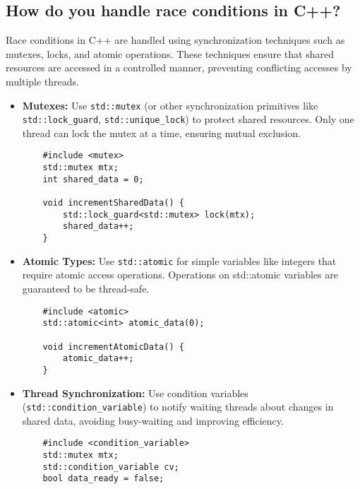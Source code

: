 \subsection{How do you handle race conditions in C++?}
Race conditions in C++ are handled using synchronization techniques such as mutexes, locks, and atomic operations. These techniques ensure that shared resources are accessed in a controlled manner, preventing conflicting accesses by multiple threads. \\
\begin{itemize}
    \item \textbf{Mutexes:} Use \texttt{std::mutex} (or other synchronization primitives like \texttt{std::lock\_guard}, \texttt{std::unique\_lock}) to protect shared resources. Only one thread can lock the mutex at a time, ensuring mutual exclusion.
    \begin{tcolorbox}[title=Mutexes]
    \begin{verbatim}
    #include <mutex>
    std::mutex mtx;
    int shared_data = 0;

    void incrementSharedData() {
        std::lock_guard<std::mutex> lock(mtx);
        shared_data++;
    }
    \end{verbatim}
    \end{tcolorbox}
    \item \textbf{Atomic Types:} Use \texttt{std::atomic} for simple variables like integers that require atomic access operations. Operations on std::atomic variables are guaranteed to be thread-safe. \\
    \begin{tcolorbox}[title=Atomic Types]
    \begin{verbatim}
    #include <atomic>
    std::atomic<int> atomic_data(0);

    void incrementAtomicData() {
        atomic_data++;
    }
    \end{verbatim}
    \end{tcolorbox}
    \item \textbf{Thread Synchronization:} Use condition variables (\texttt{std::condition\_variable}) to notify waiting threads about changes in shared data, avoiding busy-waiting and improving efficiency. \\
    \begin{tcolorbox}[title=Thread Synchronization]
    \begin{verbatim}
    #include <condition_variable>
    std::mutex mtx;
    std::condition_variable cv;
    bool data_ready = false;


\end{verbatim}
\end{tcolorbox}
\end{itemize}
